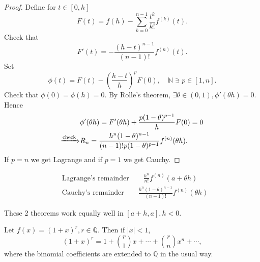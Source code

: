 \begin{proof}
    Define for $ t\in [0,h] $ 
    \[
        F(t) = f(h)-\sum_{k=0}^{n-1}\frac{t^k}{k!}f^{(k)}(t).
    \]
    Check that 
    \[
        F'(t) = - \frac{(h-t)^{n-1}}{(n-1)!}f^{(n)}(t).
    \]
    Set 
    \[
        \phi(t) = F(t) - \left( \frac{h-t}{h} \right)^p F(0),\quad \mathbb{N}\ni p \in [1,n].
    \]
    Check that $ \phi(0)=\phi(h)=0 $. By Rolle's theorem, $ \exists \theta\in (0,1), \phi'(\theta h)=0$. Hence
    \begin{align*}
        &\phi'(\theta h) = F'(\theta h) +\frac{p(1-\theta)^{p-1}}{h} F(0)=0\\ 
        \xRightarrow{\text{check}} &R_n=\frac{h^n(1-\theta)^{n-1}}{(n-1)!p(1-\theta)^{p-1}}f^{(n)}(\theta h).
    \end{align*}
    If $p=n$ we get Lagrange and if $p=1$ we get Cauchy.
\end{proof}
\begin{remark}
    \begin{align*}
        &\text{Lagrange's remainder}\qquad  \frac{h^n}{n!}f^{(n)}(a+\theta h)\\ 
        &\text{Cauchy's remainder}\qquad  \frac{h^n(1-\theta)^{n-1}}{(n-1)!}f^{(n)}(\theta h)
    \end{align*}
\end{remark}
\begin{remark}
    These 2 theorems work equally well in $ [a+h,a],h<0 $.
\end{remark}
\begin{example}
    Let $ f(x) = (1+x)^r,r\in \mathbb{Q} $. Then if $ |x|<1 $, 
    \[
        (1+x)^r = 1 + \binom{r}{1}x+ \cdots + \binom{r}{n}x^n+ \cdots ,
    \]
    where the binomial coefficients are extended to $\mathbb{Q}$ in the usual way.
\end{example}
